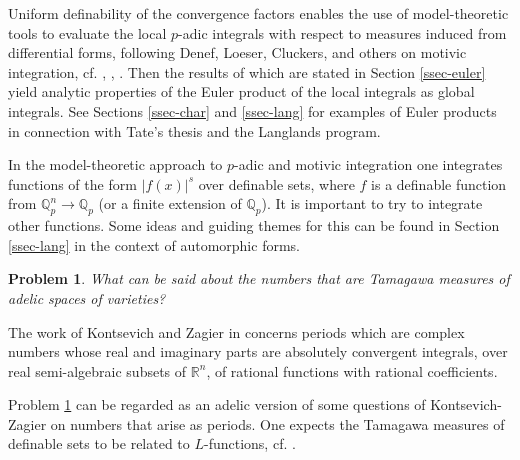 \documentclass[12pt]{amsart}
\def\R{\mathbb{R}}
\def\R{\mathbb{R}}
\def\Q{\mathbb{Q}}
\numberwithin{equation}{section}
\newtheorem{prob}{Problem}[section]
\begin{document}
Uniform definability of the convergence factors enables the use of model-theoretic tools to evaluate the local $p$-adic integrals with respect to measures induced from differential forms, following Denef, Loeser, Cluckers, and others on motivic integration, cf. \cite{Denefrationality}, \cite{DL}, \cite{CL2}. Then the results of \cite{zeta1} which are stated in Section \ref{ssec-euler} yield analytic properties of the Euler product of the local integrals as global integrals. See Sections \ref{ssec-char} and \ref{ssec-lang} 
for examples of Euler products in connection with Tate's thesis and the Langlands program.

In the model-theoretic approach to $p$-adic and motivic integration one integrates functions of the form $|f(x)|^s$ over definable sets, where $f$ is a definable function from $\Q_p^n\rightarrow \Q_p$ (or a finite extension of $\Q_p$). 
It is important to try to integrate other functions. Some ideas and guiding themes for this can be found in Section \ref{ssec-lang} in the context of automorphic forms.


\begin{prob}\cite{DM-ad}\label{adelicKZ-prob} What can be said about the numbers that are Tamagawa measures of adelic spaces of varieties?
\end{prob}

The work of Kontsevich and Zagier in \cite{KZ} concerns periods which are complex numbers whose real and imaginary parts are absolutely convergent integrals, over real semi-algebraic subsets of $\R^n$, of rational functions with rational coefficients.

Problem \ref{adelicKZ-prob} can be regarded as an adelic version of some questions of Kontsevich-Zagier on numbers that arise as periods. One expects the Tamagawa measures of definable sets to be related to $L$-functions, cf. \cite{manin-book}.

\end{document}
